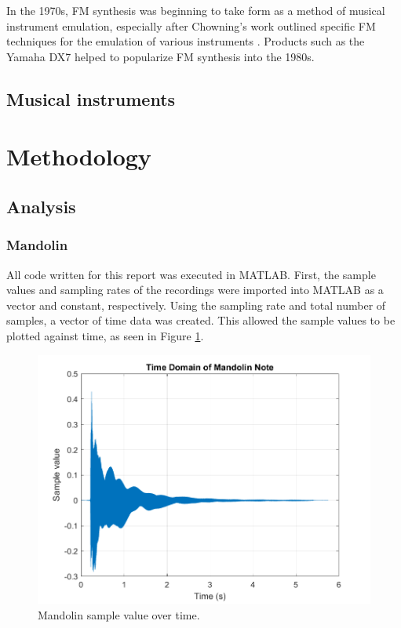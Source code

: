 \documentclass{article}
\begin{document}
        In the 1970s, FM synthesis was beginning to take form as a method of musical instrument emulation, especially after Chowning's work outlined specific FM techniques for the emulation of various instruments \cite{chowning1973synthesis}.
        Products such as the Yamaha DX7 helped to popularize FM synthesis into the 1980s.
        
    \subsection{Musical instruments}

\section{Methodology}
    \subsection{Analysis}
        \subsubsection{Mandolin}
            All code written for this report was executed in MATLAB.
            First, the sample values and sampling rates of the recordings were imported into MATLAB as a vector and constant, respectively.
            Using the sampling rate and total number of samples, a vector of time data was created.
            This allowed the sample values to be plotted against time, as seen in Figure \ref{timeDomainMando}.
            \begin{figure}[H]
                \includegraphics[scale=0.5]{images/timeDomainMando.png}%
                \centering
                \caption{Mandolin sample value over time.}
                \label{timeDomainMando}
            \end{figure}
            
\end{document}
